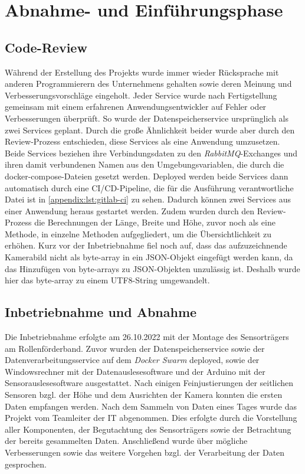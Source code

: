 \section{Abnahme- und Einführungsphase}

\subsection{Code-Review}

Während der Erstellung des Projekts wurde immer wieder Rücksprache mit anderen Programmierern des Unternehmens gehalten sowie deren Meinung und Verbesserungsvorschläge eingeholt. Jeder Service wurde nach Fertigstellung gemeinsam mit einem erfahrenen Anwendungsentwickler auf Fehler oder Verbesserungen überprüft. So wurde der Datenspeicherservice ursprünglich als zwei Services geplant. Durch die große Ähnlichkeit beider wurde aber durch den Review-Prozess  entschieden, diese Services als eine Anwendung umzusetzen. Beide Services beziehen ihre Verbindungsdaten zu den \textit{\gls{RabbitMQ}}-Exchanges und ihren damit verbundenen Namen aus den Umgebungsvariablen, die durch die docker-compose-Dateien gesetzt werden. Deployed werden beide Services dann automatisch durch eine \ac{CI/CD}-Pipeline, die für die Ausführung verantwortliche Datei ist in \vref{appendix:lst:gitlab-ci} zu sehen. Dadurch können zwei Services aus einer Anwendung heraus gestartet werden. Zudem wurden durch den Review-Prozess die Berechnungen der Länge, Breite und Höhe, zuvor noch als eine Methode, in einzelne Methoden aufgegliedert, um die Übersichtlichkeit zu erhöhen. Kurz vor der Inbetriebnahme fiel noch auf, dass das aufzuzeichnende Kamerabild nicht als byte-array in ein JSON-Objekt eingefügt werden kann, da das Hinzufügen von byte-arrays zu JSON-Objekten unzulässig ist. Deshalb wurde hier das byte-array zu einem UTF8-String umgewandelt.


\subsection{Inbetriebnahme und Abnahme}

Die Inbetriebnahme erfolgte am 26.10.2022 mit der Montage des Sensorträgers am Rollenförderband. Zuvor wurden der Datenspeicherservice sowie der Datenverarbeitungsservice auf dem \textit{\gls{Docker Swarm}} deployed, sowie der Windowsrechner mit der Datenauslesesoftware und der Arduino mit der Sensorauslesesoftware ausgestattet. Nach einigen Feinjustierungen der seitlichen Sensoren bzgl. der Höhe und dem Ausrichten der Kamera konnten die ersten Daten empfangen werden. Nach dem Sammeln von Daten eines Tages wurde das Projekt vom Teamleiter der IT abgenommen. Dies erfolgte durch die Vorstellung aller Komponenten, der Begutachtung des Sensorträgers sowie der Betrachtung der bereits gesammelten Daten. Anschließend wurde über mögliche Verbesserungen sowie das weitere Vorgehen bzgl. der Verarbeitung der Daten gesprochen.

